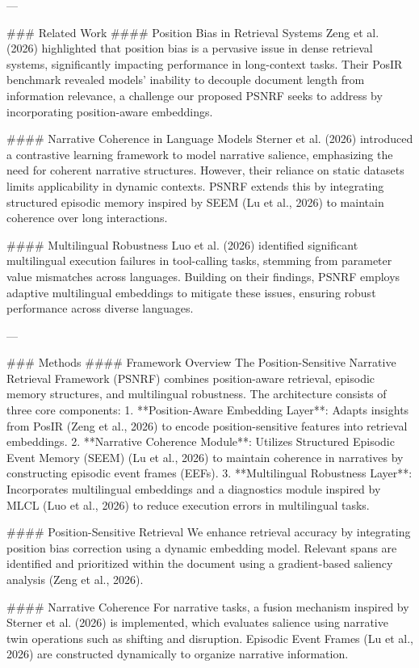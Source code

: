 ---

### Related Work
#### Position Bias in Retrieval Systems
Zeng et al. (2026) highlighted that position bias is a pervasive issue in dense retrieval systems, significantly impacting performance in long-context tasks. Their PosIR benchmark revealed models' inability to decouple document length from information relevance, a challenge our proposed PSNRF seeks to address by incorporating position-aware embeddings.

#### Narrative Coherence in Language Models
Sterner et al. (2026) introduced a contrastive learning framework to model narrative salience, emphasizing the need for coherent narrative structures. However, their reliance on static datasets limits applicability in dynamic contexts. PSNRF extends this by integrating structured episodic memory inspired by SEEM (Lu et al., 2026) to maintain coherence over long interactions.

#### Multilingual Robustness
Luo et al. (2026) identified significant multilingual execution failures in tool-calling tasks, stemming from parameter value mismatches across languages. Building on their findings, PSNRF employs adaptive multilingual embeddings to mitigate these issues, ensuring robust performance across diverse languages.

---

### Methods
#### Framework Overview
The Position-Sensitive Narrative Retrieval Framework (PSNRF) combines position-aware retrieval, episodic memory structures, and multilingual robustness. The architecture consists of three core components:
1. **Position-Aware Embedding Layer**: Adapts insights from PosIR (Zeng et al., 2026) to encode position-sensitive features into retrieval embeddings.
2. **Narrative Coherence Module**: Utilizes Structured Episodic Event Memory (SEEM) (Lu et al., 2026) to maintain coherence in narratives by constructing episodic event frames (EEFs).
3. **Multilingual Robustness Layer**: Incorporates multilingual embeddings and a diagnostics module inspired by MLCL (Luo et al., 2026) to reduce execution errors in multilingual tasks.

#### Position-Sensitive Retrieval
We enhance retrieval accuracy by integrating position bias correction using a dynamic embedding model. Relevant spans are identified and prioritized within the document using a gradient-based saliency analysis (Zeng et al., 2026).

#### Narrative Coherence
For narrative tasks, a fusion mechanism inspired by Sterner et al. (2026) is implemented, which evaluates salience using narrative twin operations such as shifting and disruption. Episodic Event Frames (Lu et al., 2026) are constructed dynamically to organize narrative information.

